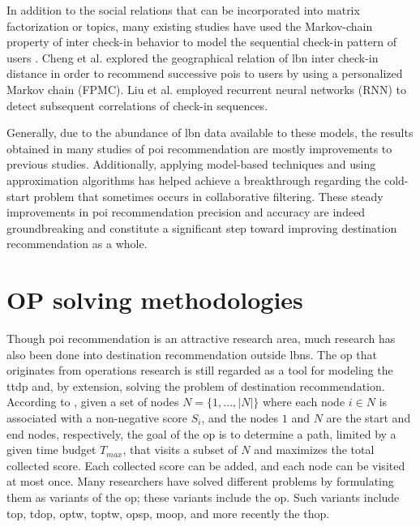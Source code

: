 In addition to the social relations that can be incorporated into matrix factorization or topics, many existing studies have used the Markov-chain property of inter check-in behavior to model the sequential check-in pattern of users \parencite{Cheng2013WhereRecommendation, Zhao2016STELLAR:Recommendation, Yang2013ASystem}. Cheng et al. \parencite{Cheng2013WhereRecommendation} explored the geographical relation of \gls{lbn} inter check-in distance in order to recommend successive \glspl{poi} to users by using a personalized Markov chain (FPMC). Liu et al. \parencite{Liu2016PredictingContexts} employed recurrent neural networks (RNN) to detect subsequent correlations of check-in sequences.

Generally, due to the abundance of \gls{lbn} data available to these models, the results obtained in many studies of \gls{poi} recommendation are mostly improvements to previous studies. Additionally, applying model-based techniques and using approximation algorithms has helped achieve a breakthrough regarding the cold-start problem that sometimes occurs in collaborative filtering. These steady improvements in \gls{poi} recommendation precision and accuracy are indeed groundbreaking and constitute a significant step toward improving destination recommendation as a whole.


\section{OP solving methodologies}
Though \gls{poi} recommendation is an attractive research area, much research has also been done into destination recommendation outside \glspl{lbn}. The \gls{op} that originates from operations research is still regarded as a tool for modeling the \gls{ttdp} and, by extension, solving the problem of destination recommendation. According to \parencite{Vansteenwegen2011TheSurvey}, given a set of nodes $N = \{1,...,|N|\}$ where each node $i \in N$ is associated with a non-negative score $S_i$, and the nodes $1$ and $N$ are the start and end nodes, respectively, the goal of the \gls{op} is to determine a path, limited by a given time budget $T_{max}$, that visits a subset of $N$ and maximizes the total collected score. Each collected score can be added, and each node can be visited at most once. Many researchers have solved different problems by formulating them as variants of the \gls{op}; these variants include the \gls{op}. Such variants include \gls{top}, \gls{tdop}, \gls{optw}, \gls{toptw}, \gls{opsp}, \gls{moop}, and more recently the \gls{thop}.

